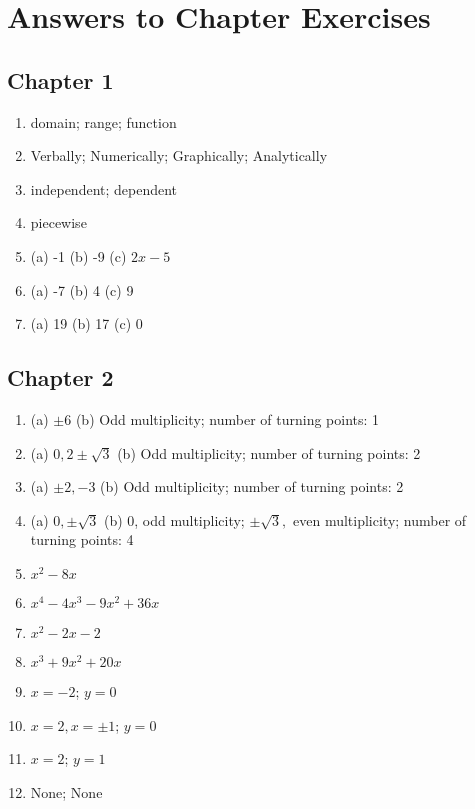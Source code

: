 \chapter*{Answers to Chapter Exercises}

\section*{Chapter 1}
\twocol
\begin{enumerate}
    \item domain; range; function
    \item Verbally; Numerically; Graphically; Analytically
    \item independent; dependent
    \item piecewise
    \item (a) -1 (b) -9 (c) $2x-5$
    \item (a) -7 (b) 4 (c) 9
    \item (a) 19 (b) 17 (c) 0
\end{enumerate}
\endtwocol

\section*{Chapter 2}
\twocol
\begin{enumerate}
    \item (a) $\pm 6$ (b) Odd multiplicity; number of turning points: 1
    \item (a) $0, 2\pm \sqrt{3}$ (b) Odd multiplicity; number of turning points: 2
    \item (a) $\pm 2, -3$ (b) Odd multiplicity; number of turning points: 2
    \item (a) $0, \pm \sqrt{3}$ (b) 0, odd multiplicity; $\pm \sqrt{3},$ even multiplicity; number of turning points: 4
    \item $x^2-8x$
    \item $x^4-4x^3-9x^2+36x$
    \item $x^2-2x-2$
    \item $x^3+9x^2+20x$
    \item $x=-2$; $y=0$
    \item $x=2, x=\pm 1$; $y=0$
    \item $x=2$; $y=1$
    \item None; None
\end{enumerate}
\endtwocol

